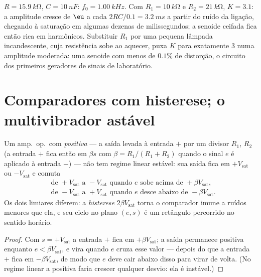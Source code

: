 \begin{example}\label{ex:b2:feedback-oscillators:wiennumbers}
$R = \qty{15.9}{k\ohm}$, $C = \qty{10}{nF}$: $f_0 = \qty{1.00}{kHz}$. Com $R_1 =
\qty{10}{k\ohm}$ e $R_2 = \qty{21}{k\ohm}$, $K = 3.1$: a amplitude cresce de
$\eu$ a cada $2RC/0.1 = \qty{3.2}{ms}$ a partir do ruído da ligação, chegando à
saturação em algumas dezenas de milissegundos; a senoide ceifada fica então
rica em harmônicos. Substituir $R_1$ por uma pequena lâmpada incandescente, cuja
resistência sobe ao aquecer, puxa $K$ para exatamente $3$ numa
amplitude moderada: uma senoide com menos de $0.1\%$ de distorção,
o circuito dos primeiros geradores de sinais de laboratório.
\end{example}

\section{Comparadores com histerese; o multivibrador astável}

\begin{proposition}\label{prop:b2:feedback-oscillators:schmitt}
Um amp.\ op.\ com  \emph{positiva} --- a saída levada à entrada $+$
por um divisor $R_1$, $R_2$ (a entrada $+$ fica então em $\beta s$ com
$\beta = R_1/(R_1 + R_2)$ quando o sinal $e$ é aplicado à entrada $-$)
--- não tem regime linear estável: sua saída fica em $+V_{\text{sat}}$ ou
$-V_{\text{sat}}$ e comuta
\begin{align*}
&\text{de } +V_{\text{sat}} \text{ a } -V_{\text{sat}} \text{ quando } e \text{ sobe acima de } +\beta V_{\text{sat}} ,\\
&\text{de } -V_{\text{sat}} \text{ a } +V_{\text{sat}} \text{ quando } e \text{ desce abaixo de } -\beta V_{\text{sat}} .
\end{align*}
Os dois limiares diferem: a \emph{histerese} $2\beta V_{\text{sat}}$ torna
o comparador imune a ruídos menores que ela, e seu ciclo no
plano $(e, s)$ é um retângulo percorrido no sentido horário.
\end{proposition}

\begin{proof}
Com $s = +V_{\text{sat}}$ a entrada $+$ fica em $+\beta V_{\text{sat}}$; a saída
permanece positiva enquanto $e < \beta V_{\text{sat}}$, e vira quando $e$ cruza
esse valor --- depois do que a entrada $+$ fica em $-\beta V_{\text{sat}}$, de modo que $e$ deve
cair abaixo disso para virar de volta. (No regime linear a 
positiva faria crescer qualquer desvio: ela é instável.)
\end{proof}

